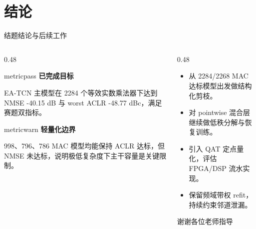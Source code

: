 \documentclass[20pt, cjk, slidetop, table]{beamer}
\begin{document}
\section{结论}
\begin{frame}{结题结论与后续工作}
  \begin{columns}[T,onlytextwidth]
    \begin{column}{0.48\linewidth}
      \begin{beamercolorbox}[wd=\linewidth,sep=0.85em]{metricpass}
        \textbf{已完成目标}\par
        EA-TCN 主模型在 2284 个等效实数乘法器下达到 NMSE -40.15 dB 与 worst ACLR -48.77 dBc，满足赛题双指标。
      \end{beamercolorbox}

      \vspace{0.45cm}
      \begin{beamercolorbox}[wd=\linewidth,sep=0.85em]{metricwarn}
        \textbf{轻量化边界}\par
        998、796、786 MAC 模型均能保持 ACLR 达标，但 NMSE 未达标，说明极低复杂度下主干容量是关键限制。
      \end{beamercolorbox}
    \end{column}
    \begin{column}{0.48\linewidth}
      \begin{itemize}
        \item 从 2284/2268 MAC 达标模型出发做结构化剪枝。
        \item 对 pointwise 混合层继续做低秩分解与恢复训练。
        \item 引入 QAT 定点量化，评估 FPGA/DSP 流水实现。
        \item 保留频域带权 refit，持续约束邻道泄漏。
      \end{itemize}

      \vspace{0.55cm}
      \begin{center}
        {\Large\textcolor{cquptblue}{谢谢各位老师指导}}
      \end{center}
    \end{column}
  \end{columns}
\end{frame}
\end{document}
